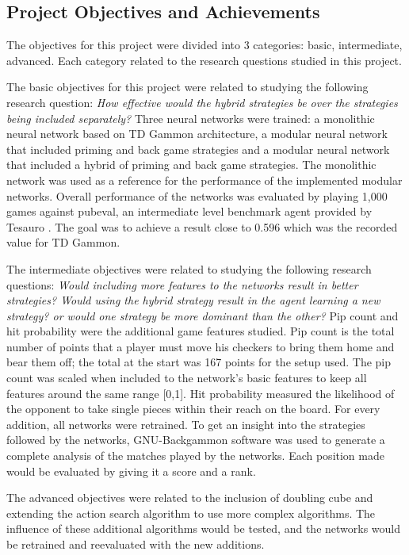 \documentclass[12pt,a4paper]{article}
\begin{document}
\subsection{Project Objectives and Achievements}
The objectives for this project were divided into 3 categories: basic, intermediate, advanced. Each category related to the research questions studied in this project.

The basic objectives for this project were related to studying the following research question: \textit{How effective would the hybrid strategies be over the strategies being included separately?} Three neural networks were trained: a monolithic neural network based on TD Gammon architecture, a modular neural network that included priming and back game strategies and a modular neural network that included a hybrid of priming and back game strategies. The monolithic network was used as a reference for the performance of the implemented modular networks. Overall performance of the networks was evaluated by playing 1,000 games against pubeval, an intermediate level benchmark agent provided by Tesauro \citeyear{pubeval}. The goal was to achieve a result close to 0.596 which was the recorded value for TD Gammon. 

The intermediate objectives were related to studying the following research questions: \textit{Would including more features to the networks result in better strategies? Would using the hybrid strategy result in the agent learning a new strategy? or would one strategy be more dominant than the other?} Pip count and hit probability were the additional game features studied. Pip count is the total number of points that a player must move his checkers to bring them home and bear them off; the total at the start was 167 points for the setup used. The pip count was scaled when included to the network's basic features to keep all features around the same range [0,1]. Hit probability measured the likelihood of the opponent to take single pieces within their reach on the board. For every addition, all networks were retrained. To get an insight into the strategies followed by the networks, GNU-Backgammon software was used to generate a complete analysis of the matches played by the networks. Each position made would be evaluated by giving it a score and a rank. 

The advanced objectives were related to the inclusion of doubling cube and extending the action search algorithm to use more complex algorithms. The influence of these additional algorithms would be tested, and the networks would be retrained and reevaluated with the new additions. 
\end{document}
